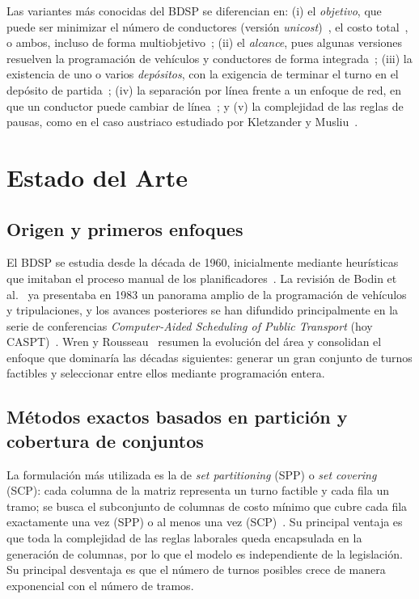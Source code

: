 \documentclass[letter, 10pt]{article}
\begin{document}
Las variantes más conocidas del BDSP se diferencian en: (i) el \emph{objetivo}, que puede ser minimizar el número de conductores (versión \emph{unicost})~\cite{Yunes2005}, el costo total~\cite{Constantino2017}, o ambos, incluso de forma multiobjetivo~\cite{Lourenco2001}; (ii) el \emph{alcance}, pues algunas versiones resuelven la programación de vehículos y conductores de forma integrada~\cite{Huisman2005}; (iii) la existencia de uno o varios \emph{depósitos}, con la exigencia de terminar el turno en el depósito de partida~\cite{DeLeone2011a}; (iv) la separación por línea frente a un enfoque de red, en que un conductor puede cambiar de línea~\cite{Portugal2009,Constantino2017}; y (v) la complejidad de las reglas de pausas, como en el caso austriaco estudiado por Kletzander y Musliu~\cite{Kletzander2020}.

\section{Estado del Arte}\label{sec:eda}

\subsection{Origen y primeros enfoques}
El BDSP se estudia desde la década de 1960, inicialmente mediante heurísticas que imitaban el proceso manual de los planificadores~\cite{WrenRousseau1995}. La revisión de Bodin et al.~\cite{Bodin1983} ya presentaba en 1983 un panorama amplio de la programación de vehículos y tripulaciones, y los avances posteriores se han difundido principalmente en la serie de conferencias \emph{Computer-Aided Scheduling of Public Transport} (hoy CASPT)~\cite{Constantino2017}. Wren y Rousseau~\cite{WrenRousseau1995} resumen la evolución del área y consolidan el enfoque que dominaría las décadas siguientes: generar un gran conjunto de turnos factibles y seleccionar entre ellos mediante programación entera.

\subsection{Métodos exactos basados en partición y cobertura de conjuntos}
La formulación más utilizada es la de \emph{set partitioning} (SPP) o \emph{set covering} (SCP): cada columna de la matriz representa un turno factible y cada fila un tramo; se busca el subconjunto de columnas de costo mínimo que cubre cada fila exactamente una vez (SPP) o al menos una vez (SCP)~\cite{Portugal2009,DeLeone2011a}. Su principal ventaja es que toda la complejidad de las reglas laborales queda encapsulada en la generación de columnas, por lo que el modelo es independiente de la legislación. Su principal desventaja es que el número de turnos posibles crece de manera exponencial con el número de tramos.
\end{document}
